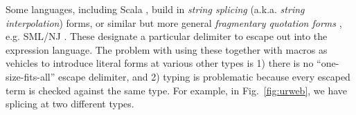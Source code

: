\documentclass[acmsmall]{acmart}
\begin{document}
  Some languages, including Scala \cite{odersky2008programming}, build in \emph{string splicing} (a.k.a. \emph{string interpolation}) forms, or similar but more general \emph{fragmentary quotation forms} \cite{conf/icfp/Slind91}, e.g. SML/NJ \cite{SML/Quote}. These designate a particular delimiter to escape out into the expression language. The problem with using these together with macros as vehicles to introduce literal forms at various other types is 1) there is no ``one-size-fits-all'' escape delimiter, and 2) typing is problematic because every escaped term is checked against the same type. For example, in Fig.~\ref{fig:urweb}, we have splicing at two different types. %
\end{document}
